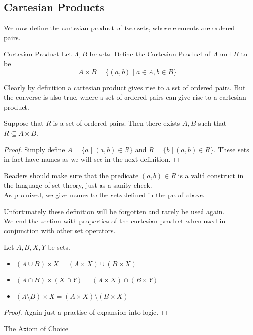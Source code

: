\documentclass[a4paper]{article}
\begin{document}
\subsection{Cartesian Products}
We now define the cartesian product of two sets, whose elements are ordered pairs. 

\begin{defn}{Cartesian Product}{} Let $A,B$ be sets. Define the Cartesian Product of $A$ and $B$ to be $$A\times B=\{(a,b)\;|\;a\in A, b\in B\}$$
\end{defn}

Clearly by definition a cartesian product gives rise to a set of ordered pairs. But the converse is also true, where a set of ordered pairs can give rise to a cartesian product. 

\begin{prp}{}{} Suppose that $R$ is a set of ordered pairs. Then there exists $A,B$ such that $R\subseteq A\times B$. 
\begin{proof}
Simply define $A=\{a\;|\;(a,b)\in R\}$ and $B=\{b\;|\;(a,b)\in R\}$. These sets in fact have names as we will see in the next definition. 
\end{proof}
\end{prp}

Readers should make sure that the predicate $(a,b)\in R$ is a valid construct in the language of set theory, just as a sanity check. \\
As promised, we give names to the sets defined in the proof above. 

Unfortunately these definition will be forgotten and rarely be used again. \\
We end the section with properties of the cartesian product when used in conjunction with other set operators. 

\begin{prp}{}{} Let $A,B,X,Y$ be sets. 
\begin{itemize}
\item $(A\cup B)\times X=(A\times X)\cup(B\times X)$
\item $(A\cap B)\times (X\cap Y)=(A\times X)\cap(B\times Y)$
\item $(A\setminus B)\times X=(A\times X)\setminus(B\times X)$
\end{itemize}
\begin{proof} Again just a practise of expansion into logic. 
\end{proof}
\end{prp}

\begin{axm}{The Axiom of Choice}{}\\
\end{axm}
\end{document}
